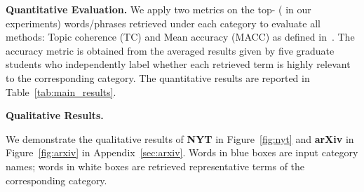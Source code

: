 \documentclass[sigconf]{acmart}
\theoremstyle{definition}
\begin{document}
\noindent
\textbf{Quantitative Evaluation.}
We apply two metrics on the top- ( in our experiments) words/phrases retrieved under each category to evaluate all methods: Topic coherence (TC) and Mean accuracy (MACC) as defined in~\cite{Meng2020DiscriminativeTM}. The accuracy metric is obtained from the averaged results given by five graduate students who independently label whether each retrieved term is highly relevant to the corresponding category. The quantitative results are reported in Table~\ref{tab:main_results}.


\begin{table}[t]
\centering
\caption{Quantitative evaluation: Hierarchical Topic Mining.}
\label{tab:main_results}
\end{table}

\noindent
\textbf{Qualitative Results.}
\begin{table}[t]
\centering
\caption{Run time (in minutes) on \textbf{NYT}. Models are run on a machine with  cores of Intel(R) Xeon(R) CPU E5-2680 v2 @  GHz.}
\label{tab:time}
\vspace*{-1em}
\end{table}
We demonstrate the qualitative results of \textbf{NYT} in Figure~\ref{fig:nyt} and \textbf{arXiv} in Figure~\ref{fig:arxiv} in Appendix~\ref{sec:arxiv}. Words in blue boxes are input category names; words in white boxes are retrieved representative terms of the corresponding category.
\end{document}
